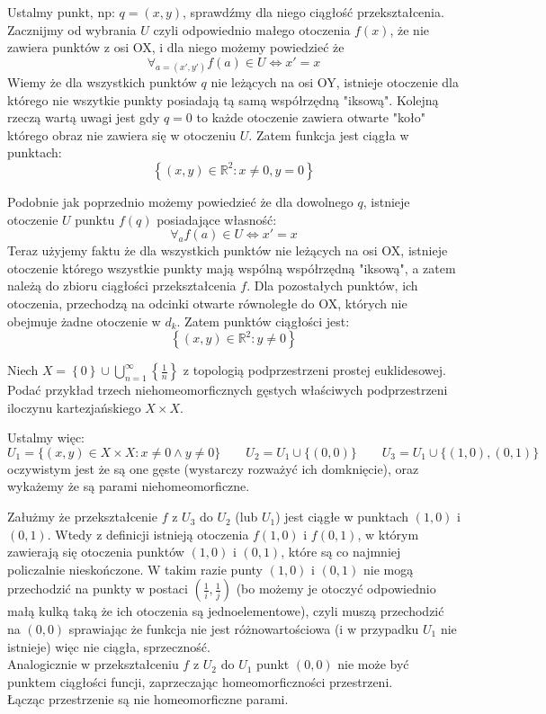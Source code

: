 \documentclass[11pt]{scrartcl}
\begin{document}
    \begin{walk}
        \item Ustalmy punkt, np: $q = (x,y)$, sprawdźmy dla niego ciągłość przekształcenia. 
          Zacznijmy od wybrania $U$ czyli odpowiednio małego otoczenia $f(x)$, że nie zawiera punktów z osi OX, i dla niego możemy powiedzieć że
          \[
            \forall_{a = (x', y')} f(a) \in U \iff  x' = x
           \]
        Wiemy że dla wszystkich punktów $q$ nie leżących na osi OY, istnieje otoczenie dla którego nie wszytkie punkty posiadają tą samą współrzędną "iksową". 
        Kolejną rzeczą wartą uwagi jest gdy $q = 0$ to każde otoczenie zawiera otwarte "koło" którego obraz nie zawiera się w otoczeniu $U$.
        Zatem funkcja jest ciągła w punktach:
        \[
            \left \{ (x, y) \in \mathbb{R}^2 : x \not = 0 , y = 0 \right \}
        \]
        \item Podobnie jak poprzednio możemy powiedzieć że dla dowolnego $q$, istnieje otoczenie $U$ punktu $f(q)$ posiadające własność:
          \[
              \forall_a f(a) \in U \iff x' = x
          \]
        Teraz użyjemy faktu że dla wszystkich punktów nie leżących na osi OX, istnieje otoczenie którego wszystkie punkty mają wspólną współrzędną "iksową", a zatem należą do zbioru ciągłości przekształcenia $f$. 
        Dla pozostałych punktów, ich otoczenia, przechodzą na odcinki otwarte równoległe do OX, których nie obejmuje żadne otoczenie w $d_k$. Zatem punktów ciągłości jest:
        \[
            \left \{ (x,y) \in \mathbb{R}^2 : y \not = 0 \right \}
        \]
    \end{walk}
    
    \begin{zadanie*}
      Niech $X = \left \{ 0 \right \} \cup \bigcup_{n=1}^\infty \left \{ \frac{1}{n} \right \}$ z topologią podprzestrzeni prostej euklidesowej. Podać przykład trzech niehomeomorficznych gęstych właściwych podprzestrzeni
iloczynu kartezjańskiego $X \times X$. 
    \end{zadanie*}

    Ustalmy więc:
    \[
      U_1 = \{ (x,y) \in X \times X : x \not = 0 \wedge y \not = 0 \} \qquad 
      U_2 = U_1 \cup \{ (0, 0) \} \qquad 
      U_3 = U_1 \cup \{ (1, 0) , (0, 1) \}
    \]
    oczywistym jest że są one gęste (wystarczy rozważyć ich domknięcie), oraz wykażemy że są parami niehomeomorficzne. 

    Załużmy że przekształcenie $f$ z $U_3$ do $U_2$ (lub $U_1$) jest ciągłe w punktach $(1,0)$ i $(0,1)$. Wtedy z definicji istnieją otoczenia $f(1,0)$ i $f(0,1)$, w którym zawierają się otoczenia punktów $(1,0)$ i $(0, 1)$, które są co najmniej policzalnie nieskończone. W takim razie punty $(1,0)$ i $(0,1)$ nie mogą przechodzić na punkty w postaci $(\frac{1}{i}, \frac{1}{j})$ (bo możemy je otoczyć odpowiednio małą kulką taką że ich otoczenia są jednoelementowe), czyli muszą przechodzić na $(0,0)$ sprawiając że funkcja nie jest różnowartościowa (i w przypadku $U_1$ nie istnieje) więc nie ciągła, sprzeczność. \\

    Analogicznie w przekształceniu $f$ z $U_2$ do $U_1$ punkt $(0,0)$ nie może być punktem ciągłości funcji, zaprzeczając homeomorficzności przestrzeni. \\

    Łącząc przestrzenie są nie homeomorficzne parami.
\end{document}
